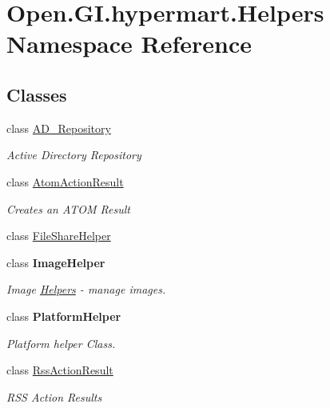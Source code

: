 \hypertarget{namespace_open_1_1_g_i_1_1hypermart_1_1_helpers}{}\section{Open.\+G\+I.\+hypermart.\+Helpers Namespace Reference}
\label{namespace_open_1_1_g_i_1_1hypermart_1_1_helpers}
\subsection*{Classes}
\begin{DoxyCompactItemize}
\item 
class \hyperlink{class_open_1_1_g_i_1_1hypermart_1_1_helpers_1_1_a_d___repository}{A\+D\+\_\+\+Repository}
\begin{DoxyCompactList}\small\item\em Active Directory Repository \end{DoxyCompactList}\item 
class \hyperlink{class_open_1_1_g_i_1_1hypermart_1_1_helpers_1_1_atom_action_result}{Atom\+Action\+Result}
\begin{DoxyCompactList}\small\item\em Creates an A\+T\+O\+M Result \end{DoxyCompactList}\item 
class \hyperlink{class_open_1_1_g_i_1_1hypermart_1_1_helpers_1_1_file_share_helper}{File\+Share\+Helper}
\item 
class {\bfseries Image\+Helper}
\begin{DoxyCompactList}\small\item\em Image \hyperlink{namespace_open_1_1_g_i_1_1hypermart_1_1_helpers}{Helpers} -\/ manage images. \end{DoxyCompactList}\item 
class {\bfseries Platform\+Helper}
\begin{DoxyCompactList}\small\item\em Platform helper Class. \end{DoxyCompactList}\item 
class \hyperlink{class_open_1_1_g_i_1_1hypermart_1_1_helpers_1_1_rss_action_result}{Rss\+Action\+Result}
\begin{DoxyCompactList}\small\item\em R\+S\+S Action Results \end{DoxyCompactList}\end{DoxyCompactItemize}

